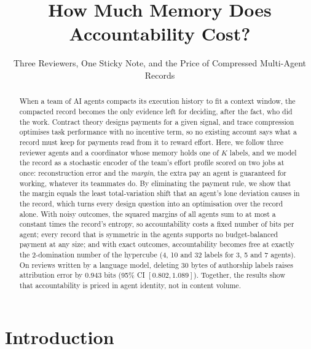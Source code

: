 \documentclass[sigconf,anonymous,acmthm=false]{acmart}
\theoremstyle{acmplain}
\theoremstyle{acmdefinition}
\begin{document}
\title{How Much Memory Does Accountability Cost?}
\subtitle{Three Reviewers, One Sticky Note, and the Price of Compressed Multi-Agent Records}

\begin{abstract}
When a team of AI agents compacts its execution history to fit a context window, the
compacted record becomes the only evidence left for deciding, after the fact, who did
the work. Contract theory designs payments for a given signal, and trace compression
optimises task performance with no incentive term, so no existing account says what a
record must keep for payments read from it to reward effort. Here, we follow three
reviewer agents and a coordinator whose memory holds one of $K$ labels, and we model the
record as a stochastic encoder of the team's effort profile scored on two jobs at once:
reconstruction error and the \emph{margin}, the extra pay an agent is guaranteed for
working, whatever its teammates do. By eliminating the payment rule, we show that the
margin equals the least total-variation shift that an agent's lone deviation causes in the
record, which turns every design question into an optimisation over the record alone.
With noisy outcomes, the squared margins of all agents sum to at most a constant times
the record's entropy, so accountability costs a fixed number of bits per agent; every
record that is symmetric in the agents supports no budget-balanced payment at any size;
and with exact outcomes, accountability becomes free at exactly the 2-domination number
of the hypercube (4, 10 and 32 labels for 3, 5 and 7 agents). On reviews written by a
language model, deleting 30 bytes of authorship labels raises attribution error by
0.943 bits (95\% CI $[0.802, 1.089]$). Together, the results show that accountability is
priced in agent identity, not in content volume.
\end{abstract}


\maketitle

\section{Introduction}\label{sec:intro}
\end{document}
